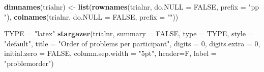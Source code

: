 \documentclass[11pt,,]{article}
\newenvironment{Shaded}{\begin{snugshade}}{\end{snugshade}}
\newcommand{\KeywordTok}[1]{\textcolor[rgb]{0.13,0.29,0.53}{\textbf{{#1}}}}
\newcommand{\DataTypeTok}[1]{\textcolor[rgb]{0.13,0.29,0.53}{{#1}}}
\newcommand{\DecValTok}[1]{\textcolor[rgb]{0.00,0.00,0.81}{{#1}}}
\newcommand{\StringTok}[1]{\textcolor[rgb]{0.31,0.60,0.02}{{#1}}}
\newcommand{\OtherTok}[1]{\textcolor[rgb]{0.56,0.35,0.01}{{#1}}}
\newcommand{\NormalTok}[1]{{#1}}
\begin{document}
\begin{Shaded}
\begin{Highlighting}[]
\KeywordTok{dimnames}\NormalTok{(trialnr) <-}\StringTok{ }\KeywordTok{list}\NormalTok{(}\KeywordTok{rownames}\NormalTok{(trialnr, }\DataTypeTok{do.NULL =} \OtherTok{FALSE}\NormalTok{, }\DataTypeTok{prefix =} \StringTok{"pp "}\NormalTok{),}
                          \KeywordTok{colnames}\NormalTok{(trialnr, }\DataTypeTok{do.NULL =} \OtherTok{FALSE}\NormalTok{, }\DataTypeTok{prefix =} \StringTok{""}\NormalTok{))}

\NormalTok{TYPE =}\StringTok{ "latex"}
\KeywordTok{stargazer}\NormalTok{(trialnr, }
          \DataTypeTok{summary =} \OtherTok{FALSE}\NormalTok{,}
          \DataTypeTok{type =} \NormalTok{TYPE, }\DataTypeTok{style =} \StringTok{"default"}\NormalTok{,}
          \DataTypeTok{title =} \StringTok{"Order of problems per participant"}\NormalTok{,}
          \DataTypeTok{digits =} \DecValTok{0}\NormalTok{, }\DataTypeTok{digits.extra =} \DecValTok{0}\NormalTok{, }\DataTypeTok{initial.zero =} \OtherTok{FALSE}\NormalTok{,}
          \DataTypeTok{column.sep.width =} \StringTok{"5pt"}\NormalTok{, }\DataTypeTok{header=}\NormalTok{F,}
          \DataTypeTok{label =} \StringTok{"problemorder"}\NormalTok{)}
\end{Highlighting}
\end{Shaded}
\end{document}
